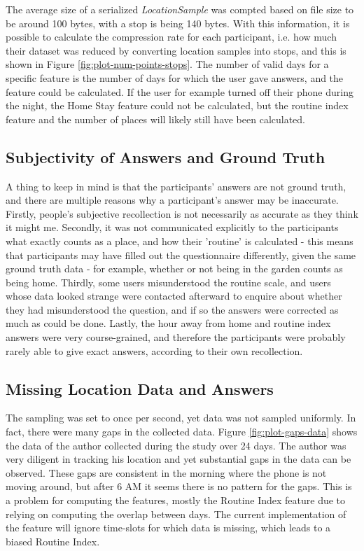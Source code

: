 The average size of a serialized \textit{LocationSample} was compted based on file size to be around 100 bytes, with a stop is being 140 bytes. With this information, it is possible to calculate the compression rate for each participant, i.e. how much their dataset was reduced by converting location samples into stops, and this is shown in Figure \ref{fig:plot-num-points-stops}. The number of valid days for a specific feature is the number of days for which the user gave answers, and the feature could be calculated. If the user for example turned off their phone during the night, the Home Stay feature could not be calculated, but the routine index feature and the number of places will likely still have been calculated.

\subsection{Subjectivity of Answers and Ground Truth}
A thing to keep in mind is that the participants' answers are not ground truth, and there are multiple reasons why a participant's answer may be inaccurate. Firstly, people's subjective recollection is not necessarily as accurate as they think it might me. Secondly, it was not communicated explicitly to the participants what exactly counts as a place, and how their 'routine' is calculated - this means that participants may have filled out the questionnaire differently, given the same ground truth data - for example, whether or not being in the garden counts as being home. Thirdly, some users misunderstood the routine scale, and users whose data looked strange were contacted afterward to enquire about whether they had misunderstood the question, and if so the answers were corrected as much as could be done. Lastly, the hour away from home and routine index answers were very course-grained, and therefore the participants were probably rarely able to give exact answers, according to their own recollection. 

\subsection{Missing Location Data and Answers}
The sampling was set to once per second, yet data was not sampled uniformly. In fact, there were many gaps in the collected data. Figure \ref{fig:plot-gaps-data} shows the data of the author collected during the study over 24 days. The author was very diligent in tracking his location and yet substantial gaps in the data can be observed. These gaps are consistent in the morning where the phone is not moving around, but after 6 AM it seems there is no pattern for the gaps. This is a problem for computing the features, mostly the Routine Index feature due to relying on computing the overlap between days. The current implementation of the feature will ignore time-slots for which data is missing, which leads to a biased Routine Index.\\


